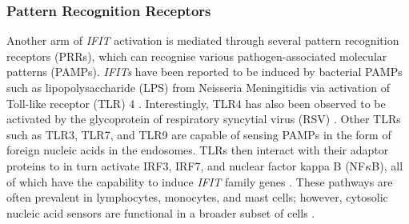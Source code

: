\subsubsection{Pattern Recognition Receptors} \label{Pattern Recognition Receptors}
Another arm of \textit{IFIT} activation is mediated through several pattern recognition receptors (PRRs), which can recognise various pathogen-associated molecular patterns (PAMPs). \textit{IFITs} have been reported to be induced by bacterial PAMPs such as lipopolysaccharide (LPS) from Neisseria Meningitidis via activation of Toll-like receptor (TLR) 4 \cite{Zhou2013InterferonDefense.}. Interestingly, TLR4 has also been observed to be activated by the glycoprotein of respiratory syncytial virus (RSV) \cite{Funchal2015RespiratoryNeutrophils}. Other TLRs such as TLR3, TLR7, and TLR9 are capable of sensing PAMPs in the form of foreign nucleic acids in the endosomes. TLRs then interact with their adaptor proteins to in turn activate IRF3, IRF7, and nuclear factor kappa B (NF\(\kappa\)B), all of which have the capability to induce \textit{IFIT} family genes \cite{Diamond2013TheProteins}. These pathways are often prevalent in lymphocytes, monocytes, and mast cells; however, cytosolic nucleic acid sensors are functional in a broader subset of cells \cite{Ablasser2011WhereFit}.

